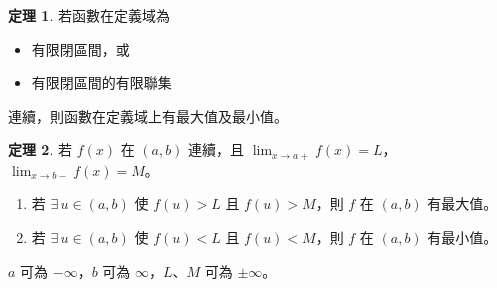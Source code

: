 \documentclass[12pt]{extarticle}
\newcommand{\ds}{\displaystyle}
\theoremstyle{definition}
\newtheorem*{thm}{定理}
\begin{document}
\begin{thm}
  若函數在定義域為
  \begin{itemize}\setlength\itemsep{0em}
    \item 有限閉區間，或
    \item 有限閉區間的有限聯集
  \end{itemize}
  連續，則函數在定義域上有最大值及最小值。
\end{thm}

\begin{thm}
  若 $f(x)$ 在 $(a, b)$ 連續，且 $\ds\lim_{x\to a+}f(x) = L$，$\ds\lim_{x\to b-}f(x) = M$。
  \begin{enumerate}\setlength\itemsep{0em}
    \item 若 $\exists\,u\in(a, b)$ 使 $f(u) > L$ 且 $f(u) > M$，則 $f$ 在 $(a, b)$ 有最大值。
    \item 若 $\exists\,u\in(a, b)$ 使 $f(u) < L$ 且 $f(u) < M$，則 $f$ 在 $(a, b)$ 有最小值。
  \end{enumerate}
  $a$ 可為 $-\infty$，$b$ 可為 $\infty$，$L$、$M$ 可為 $\pm\infty$。
\end{thm}
\end{document}
